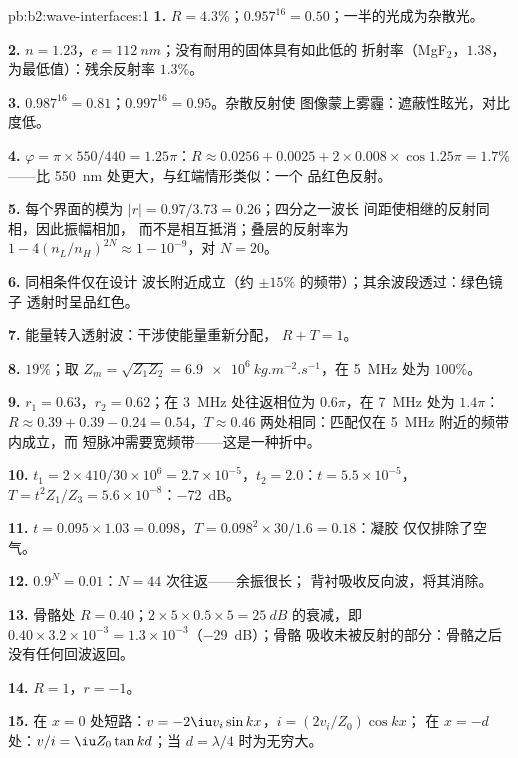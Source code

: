 \begin{solution}{pb:b2:wave-interfaces:1}
\textbf{1.} $R = 4.3\%$；$0.957^{16} = 0.50$；一半的光成为杂散光。

\textbf{2.} $n = 1.23$，$e = \qty{112}{nm}$；没有耐用的固体具有如此低的
折射率（MgF$_2$，$1.38$，为最低值）：残余反射率 $1.3\%$。

\textbf{3.} $0.987^{16} = 0.81$；$0.997^{16} = 0.95$。杂散反射使
图像蒙上雾霾：遮蔽性眩光，对比度低。

\textbf{4.} $\varphi = \pi \times 550/440 = 1.25\pi$：$R \approx 0.0256 + 0.0025 + 2 \times 0.008 \times
\cos1.25\pi = 1.7\%$——比 \qty{550}{nm} 处更大，与红端情形类似：一个
品红色反射。

\textbf{5.} 每个界面的模为 $|r| = 0.97/3.73 = 0.26$；四分之一波长
间距使相继的反射同相，因此振幅相加，
而不是相互抵消；叠层的反射率为 $1 - 4(n_L/n_H)^{2N}
\approx 1 - 10^{-9}$，对 $N = 20$。

\textbf{6.} 同相条件仅在设计
波长附近成立（约 $\pm15\%$ 的频带）；其余波段透过：绿色镜子
透射时呈品红色。

\textbf{7.} 能量转入透射波：干涉使能量重新分配，
$R + T = 1$。

\textbf{8.} $19\%$；取 $Z_m = \sqrt{Z_1Z_2} = \qty{6.9e6}{kg.m^{-2}.s^{-1}}$，在
\qty{5}{MHz} 处为 $100\%$。

\textbf{9.} $r_1 = 0.63$，$r_2 = 0.62$；在 \qty{3}{MHz} 处往返相位为
$0.6\pi$，在 \qty{7}{MHz} 处为 $1.4\pi$：$R \approx 0.39 + 0.39 - 0.24 = 0.54$，$T \approx 0.46$
两处相同：匹配仅在 \qty{5}{MHz} 附近的频带内成立，而
短脉冲需要宽频带——这是一种折中。

\textbf{10.} $t_1 = 2 \times 410/30 \times 10^6 = 2.7 \times 10^{-5}$，$t_2 = 2.0$：$t = 5.5 \times 10^{-5}$，
$T = t^2Z_1/Z_3 = 5.6 \times 10^{-8}$：\qty{-72}{dB}。

\textbf{11.} $t = 0.095 \times 1.03 = 0.098$，$T = 0.098^2 \times 30/1.6 = 0.18$：凝胶
仅仅排除了空气。

\textbf{12.} $0.9^N = 0.01$：$N = 44$ 次往返——余振很长；
背衬吸收反向波，将其消除。

\textbf{13.} 骨骼处 $R = 0.40$；$2 \times 5 \times 0.5 \times 5 = \qty{25}{dB}$ 的衰减，即
$0.40 \times 3.2 \times 10^{-3} = 1.3 \times 10^{-3}$（\qty{-29}{dB}）；骨骼
吸收未被反射的部分：骨骼之后没有任何回波返回。

\textbf{14.} $R = 1$，$r = -1$。

\textbf{15.} 在 $x = 0$ 处短路：$v = -2\iu v_i\sin kx$，$i = (2v_i/Z_0)\cos kx$；
在 $x = -d$ 处：$v/i = \iu Z_0\tan kd$；当 $d = \lambda/4$ 时为无穷大。


\end{solution}
